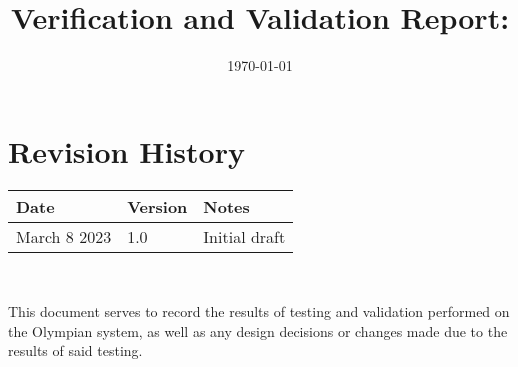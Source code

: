 \documentclass[12pt, titlepage]{article}
\begin{document}
\title{Verification and Validation Report: \progname} 
\author{\authname}
\date{\today}
	
\maketitle


\section{Revision History}

\begin{tabularx}{\textwidth}{p{3cm}p{2cm}X}
\toprule {\bf Date} & {\bf Version} & {\bf Notes}\\
\midrule
March 8 2023 & 1.0 & Initial draft\\
\bottomrule
\end{tabularx}

~\newpage

%


\newpage

\tableofcontents

\listoftables %

\newpage


This document serves to record the results of testing and validation performed on the Olympian system, as well as any design decisions or changes made due to the results of said testing.
\end{document}
